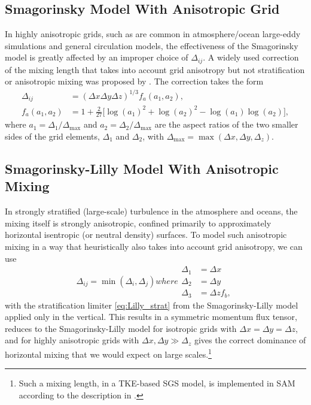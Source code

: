 \documentclass{report}
\begin{document}
\subsection{Smagorinsky Model With Anisotropic Grid}
 
In highly anisotropic grids, such as are common in atmosphere/ocean large-eddy simulations and general circulation models, the effectiveness of the Smagorinsky model is greatly affected by an improper choice of $\Delta_{ij}$. A widely used correction of the mixing length that takes into account grid anisotropy but not stratification or anisotropic mixing was proposed by  \citet{scottiMeneveauLilly1993}. The correction takes the form
\begin{subequations}\label{e:anisotropic_Smagorinsky}
\begin{align}
\Delta_{ij} &= (\Delta x \Delta y \Delta z)^{1/3} f_{a}(a_1, a_2),   \\
f_a(a_1, a_2) &= 1+\frac{2}{27}\Big[\log(a_{1})^2 + \log(a_2)^2 -\log(a_1)\log(a_2)\Big],
\end{align}
\end{subequations}
where  $a_1 =  \Delta_1/\Delta_{\max}$ and $a_2 = \Delta_2/\Delta_{\max}$ are the aspect ratios of the two smaller sides of the grid elements, $\Delta_1$ and $\Delta_2$, with $\Delta_{\max} = \max(\Delta x, \Delta y, \Delta_z)$. 

\subsection{Smagorinsky-Lilly Model With Anisotropic Mixing}\label{s:anisotropic_SGS_mixing}

In strongly stratified (large-scale) turbulence in the atmosphere and oceans, the mixing itself is strongly anisotropic, confined primarily to approximately horizontal isentropic (or neutral density) surfaces. To model such anisotropic mixing in a way that heuristically also takes into account grid anisotropy, we can use 
\begin{subequations}\label{e:anisotropic_Smag-Lilly}
\begin{equation}
\Delta_{ij} = \min(\Delta_i, \Delta_j)  
\end{equation}
where 
\begin{align}
\Delta_1 & = \Delta x \\
\Delta_2 & = \Delta y \\
\Delta_3 & = \Delta z f_b,
\end{align}
\end{subequations}
with the stratification limiter \eqref{eq:Lilly_strat} from the Smagorinsky-Lilly model applied only in the vertical. This results in a symmetric momentum flux tensor, reduces to the Smagorinsky-Lilly model for isotropic grids with $\Delta x = \Delta y = \Delta z$, and for highly anisotropic grids with $\Delta x, \Delta y \gg \Delta_z$ gives the correct dominance of horizontal mixing that we would expect on large scales.\footnote{Such a mixing length, in a TKE-based SGS model, is implemented in SAM according to the description in \citet{Stevens05a}.}
\end{document}
